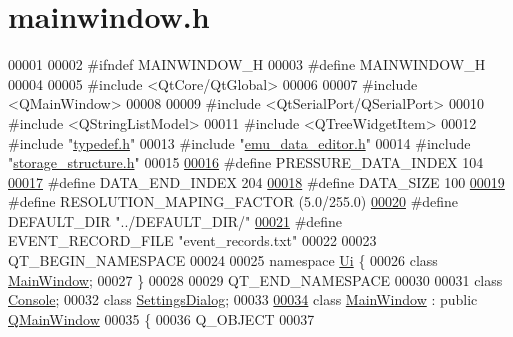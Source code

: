 \hypertarget{a00110_source}{\section{mainwindow.\+h}
\label{a00110_source}
}

\begin{DoxyCode}
00001 
00002 \textcolor{preprocessor}{#ifndef MAINWINDOW\_H}
00003 \textcolor{preprocessor}{#define MAINWINDOW\_H}
00004 
00005 \textcolor{preprocessor}{#include <QtCore/QtGlobal>}
00006 
00007 \textcolor{preprocessor}{#include <QMainWindow>}
00008 
00009 \textcolor{preprocessor}{#include <QtSerialPort/QSerialPort>}
00010 \textcolor{preprocessor}{#include <QStringListModel>}
00011 \textcolor{preprocessor}{#include <QTreeWidgetItem>}
00012 \textcolor{preprocessor}{#include "\hyperlink{a00004}{typedef.h}"}
00013 \textcolor{preprocessor}{#include "\hyperlink{a00094}{emu\_data\_editor.h}"}
00014 \textcolor{preprocessor}{#include "\hyperlink{a00006}{storage\_structure.h}"}
00015 
\hypertarget{a00110_source_l00016}{}\hyperlink{a00110_a56c4aa163f5d0c550eeb89fdb3f08996}{00016} \textcolor{preprocessor}{#define PRESSURE\_DATA\_INDEX 104}
\hypertarget{a00110_source_l00017}{}\hyperlink{a00110_a61d054f24da5242788747ba3db5dfa11}{00017} \textcolor{preprocessor}{#define DATA\_END\_INDEX 204}
\hypertarget{a00110_source_l00018}{}\hyperlink{a00110_af55149bc1f05cf18af067a302e31e3f9}{00018} \textcolor{preprocessor}{#define DATA\_SIZE 100}
\hypertarget{a00110_source_l00019}{}\hyperlink{a00110_a58055d345f4a971dad22c043135fb214}{00019} \textcolor{preprocessor}{#define RESOLUTION\_MAPING\_FACTOR  (5.0/255.0)}
\hypertarget{a00110_source_l00020}{}\hyperlink{a00110_a63ec0cea9c1f0ca8a7893c2c53d2fd81}{00020} \textcolor{preprocessor}{#define DEFAULT\_DIR             "../DEFAULT\_DIR/"}
\hypertarget{a00110_source_l00021}{}\hyperlink{a00110_a8d4ad2cd60e024f6e0f37dbac40768a1}{00021} \textcolor{preprocessor}{#define EVENT\_RECORD\_FILE       "event\_records.txt"}
00022 
00023 QT\_BEGIN\_NAMESPACE
00024 
00025 \textcolor{keyword}{namespace }\hyperlink{a00145}{Ui} \{
00026 \textcolor{keyword}{class }\hyperlink{a00017}{MainWindow};
00027 \}
00028 
00029 QT\_END\_NAMESPACE
00030 
00031 \textcolor{keyword}{class }\hyperlink{a00005}{Console};
00032 \textcolor{keyword}{class }\hyperlink{a00075}{SettingsDialog};
00033 
\hypertarget{a00110_source_l00034}{}\hyperlink{a00017}{00034} \textcolor{keyword}{class }\hyperlink{a00017}{MainWindow} : \textcolor{keyword}{public} \hyperlink{a00058}{QMainWindow}
00035 \{
00036     Q\_OBJECT
00037 

\end{DoxyCode}
